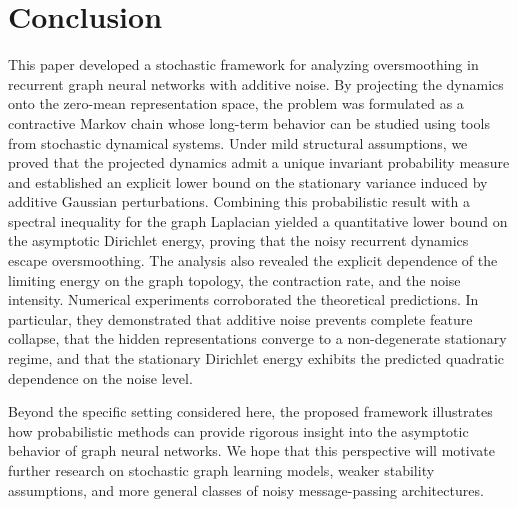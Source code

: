 \documentclass{article}
\begin{document}
\section{Conclusion}
\label{sec:Conclusion}

This paper developed a stochastic framework for analyzing oversmoothing in
recurrent graph neural networks with additive noise.
By projecting the dynamics onto the zero-mean representation space, the
problem was formulated as a contractive Markov chain whose long-term
behavior can be studied using tools from stochastic dynamical systems.
Under mild structural assumptions, we proved that the projected dynamics
admit a unique invariant probability measure and established an explicit
lower bound on the stationary variance induced by additive Gaussian
perturbations.
Combining this probabilistic result with a spectral inequality for the
graph Laplacian yielded a quantitative lower bound on the asymptotic
Dirichlet energy, proving that the noisy recurrent dynamics escape
oversmoothing.
The analysis also revealed the explicit dependence of the limiting energy
on the graph topology, the contraction rate, and the noise intensity.
Numerical experiments corroborated the theoretical predictions.
In particular, they demonstrated that additive noise prevents complete
feature collapse, that the hidden representations converge to a
non-degenerate stationary regime, and that the stationary Dirichlet
energy exhibits the predicted quadratic dependence on the noise level.

Beyond the specific setting considered here, the proposed framework
illustrates how probabilistic methods can provide rigorous insight into
the asymptotic behavior of graph neural networks.
We hope that this perspective will motivate further research on
stochastic graph learning models, weaker stability assumptions, and more
general classes of noisy message-passing architectures.

	
	


\end{document}
